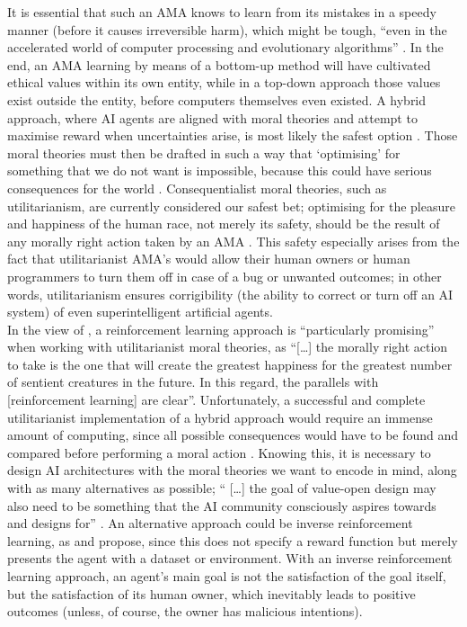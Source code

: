 \documentclass[final]{clv3} %
\begin{document}
It is essential that such an AMA knows to learn from its mistakes in a speedy manner (before it causes irreversible harm), which might be tough, “even in the accelerated world of computer processing and evolutionary algorithms” \cite[p. 151]{allen2005}. In the end, an AMA learning by means of a bottom-up method will have cultivated ethical values within its own entity, while in a top-down approach those values exist outside the entity, before computers themselves even existed. A hybrid approach, where AI agents are aligned with moral theories and attempt to maximise reward when uncertainties arise, is most likely the safest option \cite{gabriel}. Those moral theories must then be drafted in such a way that ‘optimising’ for something that we do not want is impossible, because this could have serious consequences for the world \cite{bostrom}. Consequentialist moral theories, such as utilitarianism, are currently considered our safest bet; optimising for the pleasure and happiness of the human race, not merely its safety, should be the result of any morally right action taken by an AMA \cite{gabriel}. This safety especially arises from the fact that utilitarianist AMA’s would allow their human owners or human programmers to turn them off in case of a bug or unwanted outcomes; in other words, utilitarianism ensures corrigibility (the ability to correct or turn off an AI system) \cite{soares} of even superintelligent artificial agents.\\

In the view of \citet[p. 4]{gabriel}, a reinforcement learning approach is “particularly promising” when working with utilitarianist moral theories, as “[…] the morally right action to take is the one that will create the greatest happiness for the greatest number of sentient creatures in the future. In this regard, the parallels with [reinforcement learning] are clear”. Unfortunately, a successful and complete utilitarianist implementation of a hybrid approach would require an immense amount of computing, since all possible consequences would have to be found and compared before performing a moral action \cite{allen2005}. Knowing this, it is necessary to design AI architectures with the moral theories we want to encode in mind, along with as many alternatives as possible; “ […] the goal of value-open design may also need to be something that the AI community consciously aspires towards and designs for” \cite[p. 5]{gabriel}. An alternative approach could be inverse reinforcement learning, as \citet{gabriel} and \citet{tegmark} propose, since this does not specify a reward function but merely presents the agent with a dataset or environment. With an inverse reinforcement learning approach, an agent’s main goal is not the satisfaction of the goal itself, but the satisfaction of its human owner, which inevitably leads to positive outcomes (unless, of course, the owner has malicious intentions). \\
\end{document}
